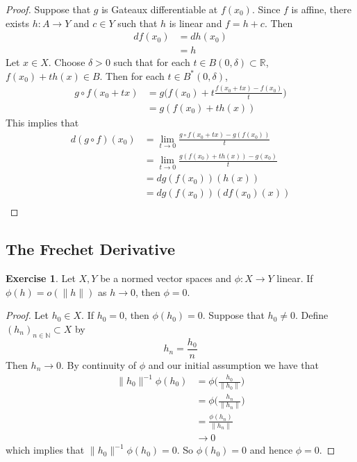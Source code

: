 \documentclass[12pt]{amsart}
\theoremstyle{definition}
\newtheorem{ex}[definition]{Exercise}
\newcommand{\del}{\delta}
\newcommand{\N}{\mathbb{N}}
\newcommand{\R}{\mathbb{R}}
\newcommand{\lex}[1]{\label{ex:#1}}
\begin{document}
	\begin{proof}
	Suppose that $g$ is Gateaux differentiable at $f(x_0)$. Since $f$ is affine, there exists $h:A \rightarrow Y$ and $c \in Y$ such that $h$ is linear and $f = h+c$. Then 
	\begin{align*}
	df(x_0) 
	&= dh(x_0) \\
	&= h
	\end{align*}
	Let $x \in X$. Choose $\del >0$ such that for each $t \in B(0, \del) \subset \R$, $f(x_0) + th(x) \in B$. Then for each $t \in B^*(0, \del)$,
	\begin{align*}
	g \circ f(x_0 + tx)
	&= g \bigg ( f(x_0) + t \frac{f(x_0 + tx) - f(x_0)}{t} \bigg) \\
	&=  g ( f(x_0) + th(x)) 
	\end{align*}
	This implies that
	\begin{align*}
	d(g \circ f)(x_0)
	&= \lim_{t \rightarrow 0 }\frac{g \circ f (x_0 + tx) - g(f(x_0))}{t} \\  
	&= \lim_{t \rightarrow 0} \frac{g ( f(x_0) + th(x)) - g(x_0)}{t} \\
	&= dg(f(x_0))(h(x)) \\
	&= dg(f(x_0))(df(x_0)(x)) \\
	\end{align*}
	\end{proof}
	
	
	
	
	
	
	
	
	
	
	
	
	
	
	
	\newpage
	\subsection{The Frechet Derivative}
	
	\begin{ex} \lex{62001}
	Let $X,Y$ be a normed vector spaces and $\phi: X \rightarrow Y$ linear. If $\phi(h) = o(\|h\|)$ as $h \rightarrow 0$, then $\phi = 0$. 
	\end{ex}
	
	\begin{proof}
	Let $h_0 \in X$. If $h_0 = 0$, then $\phi(h_0) = 0$. Suppose that $h_0 \neq 0$. Define $(h_n)_{n \in \N} \subset X$ by $$h_n = \frac{h_0}{n}$$ Then $h_n \rightarrow 0$. By continuity of $\phi$ and our initial assumption we have that 
	\begin{align*}
	\| h_0 \|^{-1} \phi ( h_0 ) 
	&= \phi \bigg( \frac{h_0}{\| h_0 \|} \bigg) \\
	&= \phi \bigg( \frac{h_n}{\| h_n \|} \bigg) \\
	&= \frac{\phi(h_n)}{\| h_n \|} \\
	& \rightarrow 0
	\end{align*}
	which implies that $\| h_0 \|^{-1}\phi ( h_0 ) = 0$. So $\phi(h_0) = 0$ and hence $\phi = 0$.
	\end{proof}
	
\end{document}
